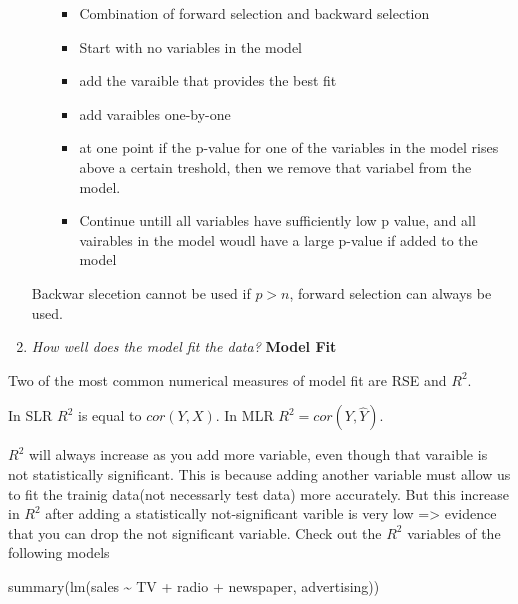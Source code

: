 \documentclass[
  letterpaper,
  DIV=11,
  numbers=noendperiod]{scrreprt}
\newenvironment{Shaded}{\begin{snugshade}}{\end{snugshade}}
\newcommand{\FunctionTok}[1]{\textcolor[rgb]{0.28,0.35,0.67}{#1}}
\newcommand{\NormalTok}[1]{\textcolor[rgb]{0.00,0.23,0.31}{#1}}
\newcommand{\SpecialCharTok}[1]{\textcolor[rgb]{0.37,0.37,0.37}{#1}}
\providecommand{\tightlist}{%
  \setlength{\itemsep}{0pt}\setlength{\parskip}{0pt}}\usepackage{longtable,booktabs,array}
\begin{document}
\begin{enumerate}
\begin{itemize}
    \begin{itemize}
    \tightlist
    \item
      Combination of forward selection and backward selection
    \item
      Start with no variables in the model
    \item
      add the varaible that provides the best fit
    \item
      add varaibles one-by-one
    \item
      at one point if the p-value for one of the variables in the model
      rises above a certain treshold, then we remove that variabel from
      the model.
    \item
      Continue untill all variables have sufficiently low p value, and
      all vairables in the model woudl have a large p-value if added to
      the model
    \end{itemize}
  \end{itemize}

  Backwar slecetion cannot be used if \(p>n\), forward selection can
  always be used.
\item
  \emph{How well does the model fit the data?} \textbf{Model Fit}
\end{enumerate}

Two of the most common numerical measures of model fit are RSE and
\(R^2\).

In SLR \(R^2\) is equal to \(cor(Y,X)\). In MLR
\(R^2 = cor(Y,\hat{Y})\).

\(R^2\) will always increase as you add more variable, even though that
varaible is not statistically significant. This is because adding
another variable must allow us to fit the trainig data(not necessarly
test data) more accurately. But this increase in \(R^2\) after adding a
statistically not-significant varible is very low =\textgreater{}
evidence that you can drop the not significant variable. Check out the
\(R^2\) variables of the following models

\begin{Shaded}
\begin{Highlighting}[]
\FunctionTok{summary}\NormalTok{(}\FunctionTok{lm}\NormalTok{(sales }\SpecialCharTok{\textasciitilde{}}\NormalTok{ TV }\SpecialCharTok{+}\NormalTok{ radio }\SpecialCharTok{+}\NormalTok{ newspaper, advertising))}
\end{Highlighting}
\end{Shaded}
\end{document}
